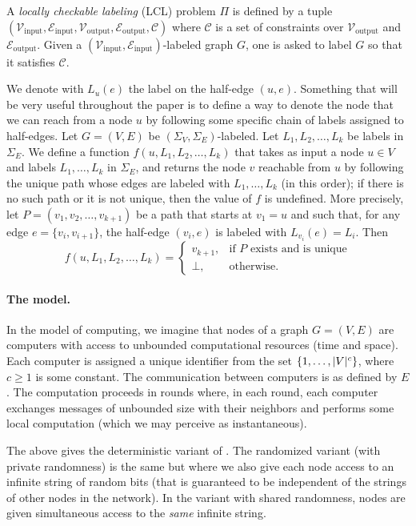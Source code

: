\documentclass[11pt]{article}
\newcommand{\inp}{\mathrm{input}}
\newcommand{\outp}{\mathrm{output}}
\DeclarePairedDelimiter{\abs}{\lvert}{\rvert}
\begin{document}
\begin{definition}
	A \emph{locally checkable labeling} (LCL) problem $\Pi$ is defined by a tuple
	$(\mathcal{V}_\inp, \mathcal{E}_\inp, \mathcal{V}_\outp, \mathcal{E}_\outp,
	\mathcal{C})$ where $\mathcal{C}$ is a set of constraints over
	$\mathcal{V}_\outp$ and $\mathcal{E}_\outp$.
	Given a $(\mathcal{V}_\inp,\mathcal{E}_\inp)$-labeled graph $G$, one is asked
	to label $G$ so that it satisfies $\mathcal{C}$.
\end{definition}

We denote with $L_u(e)$ the label on the half-edge $(u,e)$. Something that will
be very useful throughout the paper is to define a way to denote the node that
we can reach from a node $u$ by following some specific chain of labels assigned
to half-edges. Let $G = (V,E)$ be $(\Sigma_V,\Sigma_E)$-labeled. Let $L_1, L_2,
\ldots, L_k$ be labels in $\Sigma_E$. We define a function $f(u, L_1, L_2,
\ldots, L_k)$ that takes as input a node $u \in V$ and labels $L_1, \ldots, L_k$
in $\Sigma_E$, and returns the node $v$ reachable from $u$ by following the
unique path whose edges are labeled with $L_1, \ldots, L_k$ (in this order); if
there is no such path or it is not unique, then the value of $f$ is undefined.
More precisely, let $P = (v_1, v_2, \ldots, v_{k+1})$ be a path that starts at
$v_1=u$ and such that, for any edge $e=\{v_i,v_{i+1}\}$, the half-edge
$(v_i,e)$ is labeled with $L_{v_i}(e)=L_i$. Then 
\[
	f(u, L_1, L_2, \ldots, L_k)=
	\begin{cases}
		v_{k+1}, &\text{if $P$ exists and is unique} \\
		\bot, &\text{otherwise.}
	\end{cases}
\]

\paragraph{\boldmath The \local model.}
In the \local model of computing, we imagine that nodes of a graph $G = (V,E)$
are computers with access to unbounded computational resources (time and space).
Each computer is assigned a unique identifier from the set
$\{1,\dots,\abs{V}^c\}$, where $c \ge 1$ is some constant.
The communication between computers is as defined by $E$.
The computation proceeds in rounds where, in each round, each computer exchanges
messages of unbounded size with their neighbors and performs some local
computation (which we may perceive as instantaneous).

The above gives the deterministic variant of \local.
The randomized variant (with private randomness) is the same but where we also
give each node access to an infinite string of random bits (that is guaranteed
to be independent of the strings of other nodes in the network).
In the variant with shared randomness, nodes are given simultaneous access to
the \emph{same} infinite string.
\end{document}
